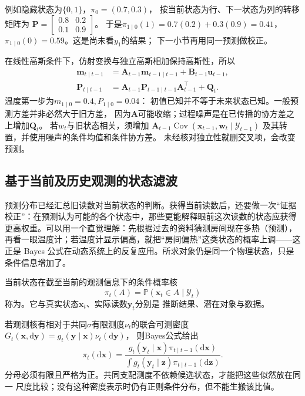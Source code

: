 例如隐藏状态为$\{0,1\}$，$\pi_0=(0.7,0.3)$，
按当前状态为行、下一状态为列的转移矩阵为
$\bm P=\left[\begin{smallmatrix}0.8&0.2\\0.1&0.9\end{smallmatrix}\right]$。
于是$\pi_{1\mid0}(1)=0.7(0.2)+0.3(0.9)=0.41$，
$\pi_{1\mid0}(0)=0.59$。这是尚未看$y_1$的结果；
下一小节再用同一预测做校正。

在线性高斯条件下，仿射变换与独立高斯相加保持高斯性，所以
\begin{align}
 \bm m_{t\mid t-1}
   &=\bm A_{t-1}\bm m_{t-1\mid t-1}+\bm B_{t-1}\bm u_{t-1},
       \label{eq:dynamical-kalman-predicted-mean}\\
 \bm P_{t\mid t-1}
   &=\bm A_{t-1}\bm P_{t-1\mid t-1}\bm A_{t-1}^\top+\bm Q_t.
       \label{eq:dynamical-kalman-predicted-covariance}
\end{align}
温度第一步为$m_{1\mid0}=0.4,P_{1\mid0}=0.04$：
初值已知并不等于未来状态已知。一般预测方差并非必然大于旧方差，
因为$\bm A$可能收缩；过程噪声是在已传播的协方差之上增加$\bm Q_t$。
若$w_t$与旧状态相关，须增加
$\bm A_{t-1}\operatorname{Cov}(\bm x_{t-1},\bm w_t\mid\mathcal Y_{t-1})$
及其转置，并使用噪声的条件均值和条件协方差。
未经核对独立性就删交叉项，会改变预测。

\subsection{基于当前及历史观测的状态滤波}
预测分布已经汇总旧读数对当前状态的判断。获得当前读数后，还要做一次“证据校正”：在预测认为可能的各个状态中，那些更能解释眼前这次读数的状态应获得更高权重。可以用一个直觉理解：先根据过去的资料猜测房间现在多热（预测），再看一眼温度计；若温度计显示偏高，就把“房间偏热”这类状态的概率上调——这正是 Bayes 公式在动态系统上的反复应用。所求对象仍是同一个物理状态，只是条件信息增加了。

\begin{definition}[滤波分布]
 \label{def:dynamical-filtering-distribution}
 当前状态在截至当前的观测信息下的条件概率核
 \begin{equation}
  \pi_t(A)=\mathbb P(\bm x_t\in A\mid\mathcal Y_t)
   \label{eq:dynamical-filtering-distribution}
 \end{equation}
 称为。它与真实状态$\bm x_t$、实际读数$\bm y_t$分别是
 推断结果、潜在对象与数据。
\end{definition}

若观测核有相对于共同$\sigma$有限测度$\nu_t$的联合可测密度
$G_t(\bm x,\mathrm d\bm y)=g_t(\bm y\mid\bm x)\nu_t(\mathrm d\bm y)$，
则Bayes公式给出
\begin{equation}
 \pi_t(\mathrm d\bm x)=
 \frac{g_t(\bm y_t\mid\bm x)\pi_{t\mid t-1}(\mathrm d\bm x)}
      {\int g_t(\bm y_t\mid\bm z)\pi_{t\mid t-1}(\mathrm d\bm z)}.
 \label{eq:dynamical-general-bayes-filter}
\end{equation}
分母必须有限且严格为正。共同支配测度不依赖候选状态，才能把这些似然放在同一
尺度比较；没有这种密度表示时仍有正则条件分布，但不能生搬该比值。

